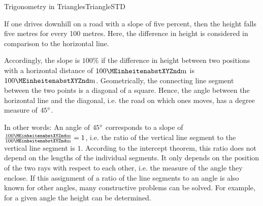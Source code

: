 \begin{MXContent}{Trigonometry in Triangles}{Triangle}{STD}

If one drives downhill on a road with a slope of five percent, then
the height falls five metres for every 100 metres. Here, the difference in height
is considered in comparison to the horizontal line.

\begin{center}
\end{center}

Accordingly, the slope is $100\%$ if the difference in height 
between two positions with a horizontal distance of $100\MEinheit{m}$
is $100\MEinheit{m}$. Geometrically, the connecting line segment between 
the two points is a diagonal of a square. Hence, the angle between the horizontal 
line and the diagonal, i.e. the road on which ones moves, has a degree measure 
of $45^{\circ}$.



\begin{center}
\end{center}

In other words: An angle of $45^{\circ}$ corresponds to a slope of 
$\frac{100\MEinheit{m}}{100\MEinheit{m}} = 1$, i.e. the ratio 
of the vertical line segment to the vertical line segment is $1$. 
According to the intercept theorem, this ratio does not depend 
on the lengths of the individual segments. It only depends on 
the position of the two rays with respect to each other, i.e. 
the measure of the angle they enclose. If this assignment of a 
ratio of the line segments to an angle is also known for other angles, many constructive 
problems can be solved. For example, for a given angle the height can be
determined. 


\end{MXContent}

